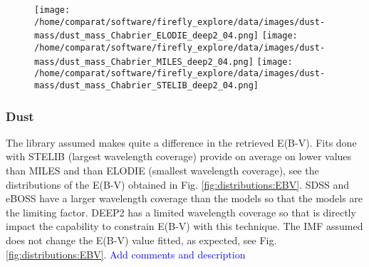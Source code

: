 \documentclass[onecolumn]{aa}
\begin{document}
\begin{figure}
\begin{center}
\texttt{[image: /home/comparat/software/firefly\_explore/data/images/dust-mass/dust\_mass\_Chabrier\_ELODIE\_deep2\_04.png]}
\hspace*{-1.7cm}
\texttt{[image: /home/comparat/software/firefly\_explore/data/images/dust-mass/dust\_mass\_Chabrier\_MILES\_deep2\_04.png]}
\hspace*{-1.7cm}
\texttt{[image: /home/comparat/software/firefly\_explore/data/images/dust-mass/dust\_mass\_Chabrier\_STELIB\_deep2\_04.png]}
\end{center}
\end{figure}

\subsubsection{Dust}
\label{subsec:res:dust}
The library assumed makes quite a difference in the retrieved E(B-V). 
Fits done with STELIB (largest wavelength coverage) provide on average on lower values than MILES and than ELODIE (smallest wavelength coverage), see the distributions of the E(B-V) obtained in Fig. \ref{fig:distributions:EBV}. 
SDSS and eBOSS have a larger wavelength coverage than the models so that the models are the limiting factor. 
DEEP2 has a limited wavelength coverage so that is directly impact the capability to constrain E(B-V) with this technique.
The IMF assumed does not change the E(B-V) value fitted, as expected, see Fig. \ref{fig:distributions:EBV}. 
\textcolor{blue}{Add comments and description}
\end{document}

